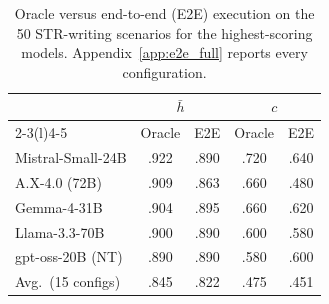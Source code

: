 \begin{table}[t]
\centering
\footnotesize
\caption{Oracle versus end-to-end (E2E) execution on the 50 STR-writing scenarios for the highest-scoring models. Appendix~\ref{app:e2e_full} reports every configuration.}
\label{tab:e2e-subset}
\begin{tabular}{@{}lcccc@{}}
\toprule
 & \multicolumn{2}{c}{$\bar{h}$} & \multicolumn{2}{c}{$c$} \\
\cmidrule(lr){2-3}\cmidrule(l){4-5}
\multicolumn{1}{c}{\textbf{Model}} & Oracle & E2E & Oracle & E2E \\
\midrule
Mistral-Small-24B & .922 & .890 & .720 & .640 \\
A.X-4.0 (72B) & .909 & .863 & .660 & .480 \\
Gemma-4-31B & .904 & .895 & .660 & .620 \\
Llama-3.3-70B & .900 & .890 & .600 & .580 \\
gpt-oss-20B (NT) & .890 & .890 & .580 & .600 \\
\midrule
Avg.\ (15 configs) & .845 & .822 & .475 & .451 \\
\bottomrule
\end{tabular}
\end{table}
